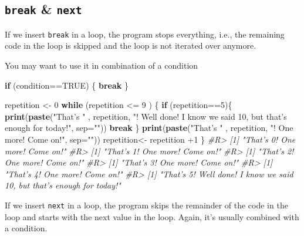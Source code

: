 \documentclass[]{book}
\newenvironment{Shaded}{}{}
\newcommand{\CommentTok}[1]{\textcolor[rgb]{0.38,0.63,0.69}{\textit{#1}}}
\newcommand{\ControlFlowTok}[1]{\textcolor[rgb]{0.00,0.44,0.13}{\textbf{#1}}}
\newcommand{\DataTypeTok}[1]{\textcolor[rgb]{0.56,0.13,0.00}{#1}}
\newcommand{\DecValTok}[1]{\textcolor[rgb]{0.25,0.63,0.44}{#1}}
\newcommand{\KeywordTok}[1]{\textcolor[rgb]{0.00,0.44,0.13}{\textbf{#1}}}
\newcommand{\NormalTok}[1]{#1}
\newcommand{\OperatorTok}[1]{\textcolor[rgb]{0.40,0.40,0.40}{#1}}
\newcommand{\OtherTok}[1]{\textcolor[rgb]{0.00,0.44,0.13}{#1}}
\newcommand{\StringTok}[1]{\textcolor[rgb]{0.25,0.44,0.63}{#1}}
\theoremstyle{definition}
\theoremstyle{definition}
\theoremstyle{definition}
\theoremstyle{remark}
\begin{document}
\hypertarget{break-next}{%
\subsection{\texorpdfstring{\texttt{break} \&
\texttt{next}}{break \& next}}\label{break-next}}

If we insert \texttt{break} in a loop, the program stops everything,
i.e., the remaining code in the loop is skipped and the loop is not
iterated over anymore.

You may want to use it in combination of a condition

\begin{Shaded}
\begin{Highlighting}[]
\ControlFlowTok{if}\NormalTok{ (condition}\OperatorTok{==}\OtherTok{TRUE}\NormalTok{) \{}
  \ControlFlowTok{break}
\NormalTok{\} }
\end{Highlighting}
\end{Shaded}

\begin{Shaded}
\begin{Highlighting}[]
\NormalTok{repetition <-}\StringTok{ }\DecValTok{0}
\ControlFlowTok{while}\NormalTok{ (repetition }\OperatorTok{<=}\StringTok{ }\DecValTok{9}\NormalTok{ ) \{}
  \ControlFlowTok{if}\NormalTok{ (repetition}\OperatorTok{==}\DecValTok{5}\NormalTok{)\{}
    \KeywordTok{print}\NormalTok{(}\KeywordTok{paste}\NormalTok{(}\StringTok{"That's "}\NormalTok{ , repetition,}
                \StringTok{"! Well done! I know we said 10, but that's enough for today!"}\NormalTok{, }\DataTypeTok{sep=}\StringTok{""}\NormalTok{))}
    \ControlFlowTok{break}
\NormalTok{  \}}
  \KeywordTok{print}\NormalTok{(}\KeywordTok{paste}\NormalTok{(}\StringTok{"That's "}\NormalTok{ , repetition, }\StringTok{"! One more! Come on!"}\NormalTok{, }\DataTypeTok{sep=}\StringTok{""}\NormalTok{)) }
\NormalTok{  repetition<-}\StringTok{ }\NormalTok{repetition }\OperatorTok{+}\DecValTok{1}
\NormalTok{\}}
\CommentTok{#R> [1] "That's 0! One more! Come on!"}
\CommentTok{#R> [1] "That's 1! One more! Come on!"}
\CommentTok{#R> [1] "That's 2! One more! Come on!"}
\CommentTok{#R> [1] "That's 3! One more! Come on!"}
\CommentTok{#R> [1] "That's 4! One more! Come on!"}
\CommentTok{#R> [1] "That's 5! Well done! I know we said 10, but that's enough for today!"}
\end{Highlighting}
\end{Shaded}

If we insert \texttt{next} in a loop, the program skips the remainder of
the code in the loop and starts with the next value in the loop. Again,
it's usually combined with a condition.
\end{document}
